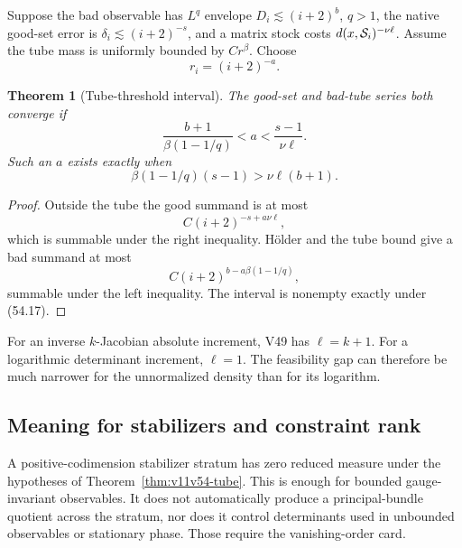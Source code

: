 \documentclass[11pt]{article}
\newtheorem{theorem}{Theorem}[section]
\begin{document}
Suppose the bad observable has \(L^q\) envelope
\(D_i\lesssim(i+2)^b\), \(q>1\), the native good-set error is
\(\delta_i\lesssim(i+2)^{-s}\), and a matrix stock costs
\(d(x,{\cal S}_i)^{-\nu\ell}\).  Assume the tube mass is uniformly
bounded by \(Cr^\beta\).  Choose
\[
                             r_i=(i+2)^{-a}.                   \tag{54.15}
\]

\begin{theorem}[Tube-threshold interval]
\label{thm:v11v54-schedule}
The good-set and bad-tube series both converge if
\[
 \frac{b+1}{\beta(1-1/q)}<a<
                              \frac{s-1}{\nu\ell}.             \tag{54.16}
\]
Such an \(a\) exists exactly when
\[
              \beta(1-1/q)(s-1)>
                              \nu\ell(b+1).                    \tag{54.17}
\]
\end{theorem}

\begin{proof}
Outside the tube the good summand is at most
\[
                 C(i+2)^{-s+a\nu\ell},
\]
which is summable under the right inequality.  Hölder and the tube
bound give a bad summand at most
\[
                 C(i+2)^{b-a\beta(1-1/q)},
\]
summable under the left inequality.  The interval is nonempty exactly
under (54.17).
\end{proof}

For an inverse \(k\)-Jacobian absolute increment, V49 has
\(\ell=k+1\).  For a logarithmic determinant increment, \(\ell=1\).
The feasibility gap can therefore be much narrower for the unnormalized
density than for its logarithm.

\subsection{Meaning for stabilizers and constraint rank}

A positive-codimension stabilizer stratum has zero reduced measure
under the hypotheses of Theorem~\ref{thm:v11v54-tube}.  This is enough
for bounded gauge-invariant observables.  It does not automatically
produce a principal-bundle quotient across the stratum, nor does it
control determinants used in unbounded observables or stationary
phase.  Those require the vanishing-order card.
\end{document}
